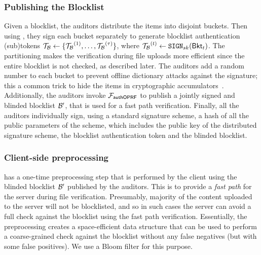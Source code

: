 \subsubsection{Publishing the Blocklist}
%
Given a blocklist, the auditors distribute the items into \numBuckets disjoint buckets. Then using \distSigningFunc, they sign each bucket separately to generate \numBuckets blocklist authentication (sub)tokens $\blklistToken{\blocklist} \assign \{ \blklistToken{\blocklist}^{(1)}, \dots, \blklistToken{\blocklist}^{(\numBuckets)}\}$, where $\blklistToken{\blocklist}^{(\bucketIdx)} \assign \sign[\privKey](\bucket{\bucketIdx})$. The partitioning makes the verification during file uploads more efficient since the entire blocklist is not checked, as described later. The auditors add a random number to each bucket to prevent offline dictionary attacks against the signature; this a common trick to hide the items in cryptographic accumulators~\cite{li2007universal}. 
 Additionally, the auditors invoke $\mathcal{F}_{\mathsf{authOPRF}}$ to publish a jointly signed and blinded blocklist $\blocklist'$, that is used for a fast path verification. Finally, all the auditors individually sign, using a standard signature scheme, a hash of all the public parameters of the scheme, which includes the public key of the distributed signature scheme, the blocklist authentication token and the blinded blocklist. 






\subsubsection{Client-side preprocessing}
%
\protocolEM has a one-time preprocessing step that is performed by the client using the blinded blocklist $\blocklist'$ published by the auditors. This is to provide a \emph{fast path} for the server during file verification. Presumably, majority of the content uploaded to the server will not be blocklisted, and so in such cases the server can avoid a full check against the blocklist using the fast path verification. Essentially, the preprocessing creates a space-efficient data structure that can be used to perform a coarse-grained check against the blocklist without any false negatives (but with some false positives). We use a Bloom filter for this purpose. 

